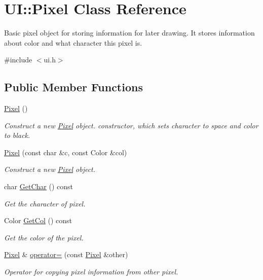 \hypertarget{classUI_1_1Pixel}{}\section{UI\+:\+:Pixel Class Reference}
\label{classUI_1_1Pixel}


Basic pixel object for storing information for later drawing. It stores information about color and what character this pixel is.  




{\ttfamily \#include $<$ui.\+h$>$}

\subsection*{Public Member Functions}
\begin{DoxyCompactItemize}
\item 
\mbox{\label{classUI_1_1Pixel_a3a5acb6d3538d3d322a1a4ea9b533f8b}} 
\hyperlink{classUI_1_1Pixel_a3a5acb6d3538d3d322a1a4ea9b533f8b}{Pixel} ()
\begin{DoxyCompactList}\small\item\em Construct a new \hyperlink{classUI_1_1Pixel}{Pixel} object. constructor, which sets character to space and color to black. \end{DoxyCompactList}\item 
\hyperlink{classUI_1_1Pixel_abf3c8bf5c8aa923e00fa636d2dbd3345}{Pixel} (const char \&c, const Color \&col)
\begin{DoxyCompactList}\small\item\em Construct a new \hyperlink{classUI_1_1Pixel}{Pixel} object. \end{DoxyCompactList}\item 
char \hyperlink{classUI_1_1Pixel_ab79e8a1113891a9260c3b77c3b17ac22}{Get\+Char} () const
\begin{DoxyCompactList}\small\item\em Get the character of pixel. \end{DoxyCompactList}\item 
Color \hyperlink{classUI_1_1Pixel_a0068bdfb2e0a853ec511df3422d17a37}{Get\+Col} () const
\begin{DoxyCompactList}\small\item\em Get the color of the pixel. \end{DoxyCompactList}\item 
\hyperlink{classUI_1_1Pixel}{Pixel} \& \hyperlink{classUI_1_1Pixel_a941e174c6d89806fd52f5f4a99c994f2}{operator=} (const \hyperlink{classUI_1_1Pixel}{Pixel} \&other)
\begin{DoxyCompactList}\small\item\em Operator for copying pixel information from other pixel. \end{DoxyCompactList}\end{DoxyCompactItemize}


